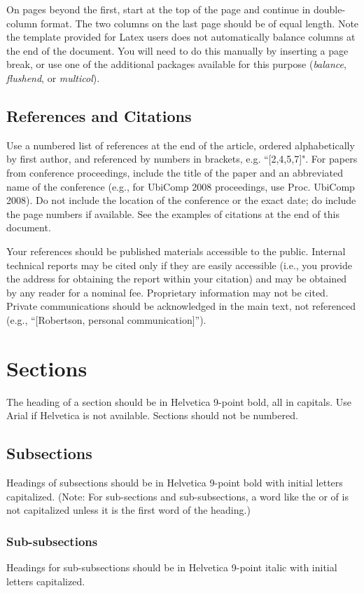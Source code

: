 \documentclass{ubicomp2013}
\begin{document}
On pages beyond the first, start at the top of the page and continue
in double-column format.  The two columns on the last page should be
of equal length. Note the template provided for Latex users does not automatically balance columns at the end of the document. You will need to do this manually by inserting a page break, or use one of the additional packages available for this purpose (\emph{balance}, \emph{flushend}, or \emph{multicol}).

\subsection{References and Citations}

Use a numbered list of references at the end of the article, ordered
alphabetically by first author, and referenced by numbers in brackets, e.g.
``[2,4,5,7]". For papers from conference proceedings, include the title
of the paper and an abbreviated name of the conference (e.g., for
UbiComp 2008 proceedings, use Proc. UbiComp 2008). Do not include
the location of the conference or the exact date; do include the page
numbers if available. See the examples of citations at the end of this
document.

Your references should be published materials accessible to the
public.  Internal technical reports may be cited only if they are
easily accessible (i.e., you provide the address for obtaining the
report within your citation) and may be obtained by any reader for a
nominal fee.  Proprietary information may not be cited. Private
communications should be acknowledged in the main text, not referenced
(e.g., ``[Robertson, personal communication]'').


\section{Sections}
The heading of a section should be in Helvetica 9-point bold, all in capitals. Use Arial if Helvetica is not available. Sections should not be numbered.

\subsection{Subsections}
Headings of subsections should be in Helvetica 9-point bold with initial letters capitalized. (Note: For sub-sections and sub-subsections, a word like the or of is not capitalized unless it is the first word of the heading.)

\subsubsection{Sub-subsections}
Headings for sub-subsections should be in Helvetica 9-point italic with initial letters capitalized.
\end{document}
